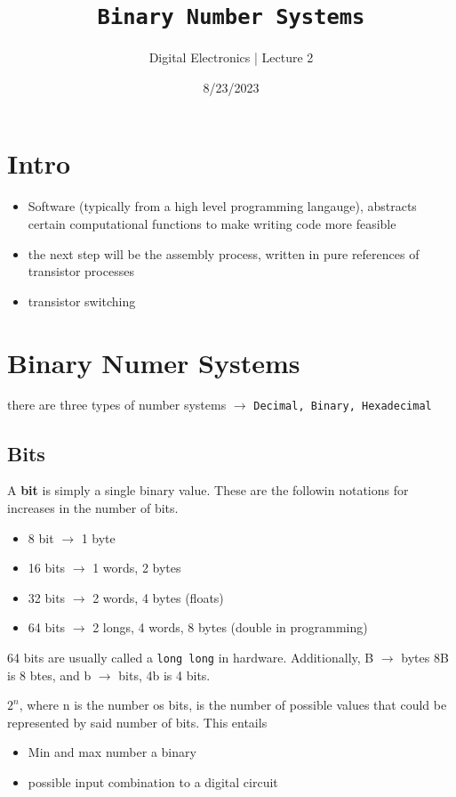 \documentclass[a4paper,12pt]{article}
\title{\texttt{Binary Number Systems}\\\hrulefill}
\author{Digital Electronics | Lecture 2}
\date{8/23/2023}
\begin{document}
    \maketitle

    \section*{Intro}
    
    \begin{itemize}
        \item Software (typically from a high level programming langauge), abstracts certain computational functions to make writing code more feasible
        \item the next step will be the assembly process, written in pure references of transistor processes
        \item transistor switching 
    \end{itemize}
    \section*{Binary Numer Systems}
    there are three types of number systems $\rightarrow$ \texttt{Decimal, Binary, Hexadecimal}

    \subsection*{Bits}
        A \textbf{bit} is simply a single binary value. These are the followin notations for increases in the number of bits.
        \begin{itemize}
            \item 8 bit $\rightarrow$ 1 byte
            \item 16 bits $\rightarrow$ 1 words, 2 bytes
            \item 32 bits $\rightarrow$ 2 words, 4 bytes (floats)
            \item 64 bits $\rightarrow$ 2 longs, 4 words, 8 bytes (double in programming)
        \end{itemize}
        64 bits are usually called a \texttt{long long} in hardware. Additionally, B $\rightarrow$ bytes 8B is 8 btes, and b $\rightarrow$ bits, 4b is 4 bits.
        \par $2^n$, where n is the number os bits, is the number of possible values that could be represented by said number of bits. This entails
        \begin{itemize}
            \item Min and max number a binary 
            \item possible input combination to a digital circuit
        \end{itemize}
\end{document}
